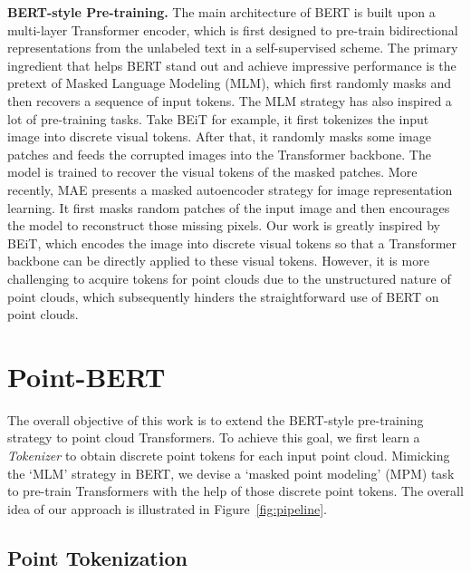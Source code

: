 \documentclass[10pt,twocolumn,letterpaper]{article}
\newcommand{\paragrapha}[2][5pt]{\vspace{#1}\noindent\textbf{#2}}
\begin{document}
\paragrapha{BERT-style Pre-training.} The main architecture of BERT\cite{bert} is built upon a  multi-layer Transformer encoder, which is first designed to pre-train bidirectional representations from the unlabeled text in a self-supervised scheme. The primary ingredient that helps BERT stand out and achieve impressive performance is the pretext of Masked Language Modeling (MLM), which first randomly masks and then recovers a sequence of input tokens.
	The MLM strategy has also inspired a lot of pre-training tasks\cite{joshi2020spanbert,liu2019roberta,conneau2019cross,trinh2019selfie,beit}. Take BEiT\cite{beit} for example, it first tokenizes the input image into discrete visual tokens. After that, it randomly masks some image patches and feeds the corrupted images into the Transformer backbone. The model is trained to recover the visual tokens of the masked patches.   More recently, MAE\cite{mae}  presents a masked autoencoder strategy for image representation learning. It first masks random patches of the input image and then encourages the model to reconstruct those missing pixels. Our work is greatly inspired by BEiT\cite{beit}, which encodes the image into discrete visual tokens so that a Transformer backbone can be directly applied to these visual tokens. However, it is more challenging to acquire tokens for point clouds due to the unstructured nature of point clouds, which subsequently hinders the straightforward use of BERT on point clouds. 

\section{Point-BERT}
\label{sec:app}
	
The overall objective of this work is to extend the BERT-style pre-training strategy to point cloud Transformers.	To achieve this goal, we first learn a  \textit{Tokenizer} to obtain discrete point tokens for each input point cloud.  Mimicking the `MLM' strategy in BERT\cite{bert}, we devise a `masked point modeling' (MPM) task to pre-train Transformers with the help of those discrete point tokens. The overall idea of our approach is illustrated in Figure~\ref{fig:pipeline}. 

	
\subsection{Point Tokenization} \label{p:dvae}
\end{document}

